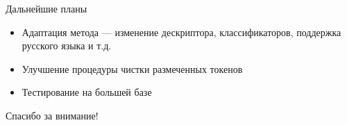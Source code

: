 \documentclass[14pt,mathserif,aspectratio=43]{beamer}
\begin{document}
\begin{frame}{Дальнейшие планы}
	\begin{itemize}
		\item Адаптация метода --- изменение дескриптора, классификаторов, поддержка русского языка и т.д.
		\item Улучшение процедуры чистки размеченных токенов
		\item Тестирование на большей базе
	\end{itemize}
\end{frame}

\begin{frame}{}
	\begin{center}
		Спасибо за внимание!\\
	\end{center}
\end{frame}
\end{document}
